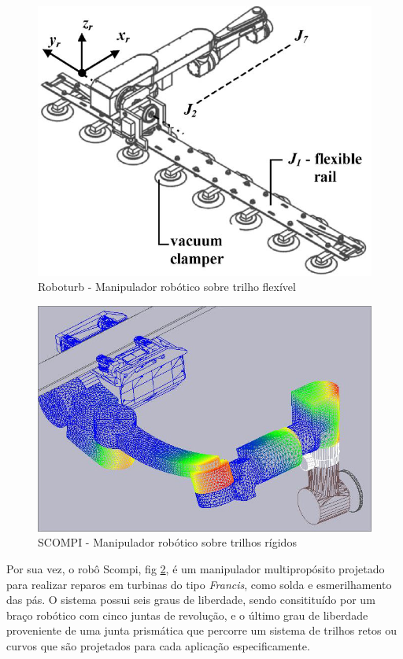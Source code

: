     \begin{figure}[h!]	
		\includegraphics[width=\columnwidth]{sota/figs/trilhos/roboturbpaper}
		\caption{Roboturb - Manipulador robótico sobre trilho flexível}
		\label{fig::roboturb}
	\end{figure}
	\begin{figure}[h!]
		\includegraphics[width=\columnwidth]{sota/figs/trilhos/scompi}
		\caption{SCOMPI - Manipulador robótico sobre trilhos rígidos}
		\label{fig::scompi}
	\end{figure}

Por sua vez, o robô Scompi, fig \ref{fig::scompi}, é um manipulador
multipropósito projetado para realizar reparos em turbinas do tipo \textit{Francis},
 como solda e esmerilhamento das pás. O sistema possui seis graus de liberdade,
 sendo consitituído por um braço robótico com cinco juntas de revolução, e o
 último grau de liberdade proveniente de uma junta prismática que percorre um sistema de 
 trilhos retos ou curvos que são projetados para cada aplicação especificamente. 


